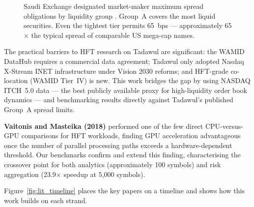 \documentclass[12pt]{article}
\begin{document}
\begin{figure}[h]
\centering
{}
\caption{Saudi Exchange designated market-maker maximum spread obligations
by liquidity group \cite{tadawul2023}. Group~A covers the most liquid
securities. Even the tightest tier permits 65~bps --- approximately
65$\times$ the typical spread of comparable US mega-cap names.}
\label{fig:tadawul_groups}
\end{figure}

The practical barriers to HFT research on Tadawul are significant: the
WAMID DataHub requires a commercial data agreement; Tadawul only adopted
Nasdaq X-Stream INET infrastructure under Vision 2030 reforms; and
HFT-grade co-location (WAMID Tier~IV) is new. This work bridges the
gap by using NASDAQ ITCH~5.0 data --- the best publicly available proxy
for high-liquidity order book dynamics --- and benchmarking results
directly against Tadawul's published Group~A spread limits.

\textbf{Vaitonis and Masteika (2018)} \cite{vaitonis2018} performed one
of the few direct CPU-versus-GPU comparisons for HFT workloads, finding
GPU acceleration advantageous once the number of parallel processing
paths exceeds a hardware-dependent threshold. Our benchmarks confirm and
extend this finding, characterising the crossover point for both analytics
(approximately 100 symbols) and risk aggregation (23.9$\times$ speedup
at 5{,}000 symbols).

Figure~\ref{fig:lit_timeline} places the key papers on a timeline and
shows how this work builds on each strand.
\end{document}
